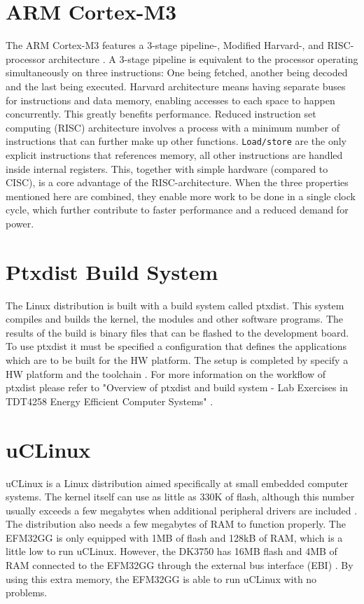 \section{ARM Cortex-M3}
The ARM Cortex-M3 features a 3-stage pipeline-, Modified Harvard-, and RISC-processor architecture \cite{CORTEXM3RM}. A 3-stage pipeline is equivalent to the processor operating simultaneously on three instructions: One being fetched, another being decoded and the last being executed. Harvard architecture means having separate buses for instructions and data memory, enabling accesses to each space to happen concurrently. This greatly benefits performance. Reduced instruction set computing (RISC) architecture involves a process with a minimum number of instructions that can further make up other functions. \texttt{Load/store} are the only explicit instructions that references memory, all other instructions are handled inside internal registers. This, together with simple hardware (compared to CISC), is a core advantage of the RISC-architecture. When the three properties mentioned here are combined, they enable more work to be done in a single clock cycle, which further contribute to faster performance and a reduced demand for power. 

\section{Ptxdist Build System}

The Linux distribution is built with a build system called ptxdist. This system compiles and builds the kernel, the modules and other software programs. The results of the build is binary files that can be flashed to the development board. To use ptxdist it must be specified a configuration that defines the applications which are to be built for the HW platform. The setup is completed by specify a HW platform and the toolchain \cite{ptxsetup}. For more information on the workflow of ptxdist please refer to "Overview of ptxdist and build system - Lab Exercises in TDT4258 Energy Efficient Computer Systems" \cite{COMPENDIUM}.

\section{uCLinux}

uCLinux is a Linux distribution aimed specifically at small embedded computer systems. The kernel itself can use as little as 330K of flash, although this number usually exceeds a few megabytes when additional peripheral drivers are included . The distribution also needs a few megabytes of RAM to function properly. The EFM32GG is only equipped with 1MB of flash and 128kB of RAM, which is a little low to run uCLinux. However, the DK3750 has 16MB flash and 4MB of RAM connected to the EFM32GG through the external bus interface (EBI) \cite{DK3750RM}. By using this extra memory, the EFM32GG is able to run uCLinux with no problems.  

